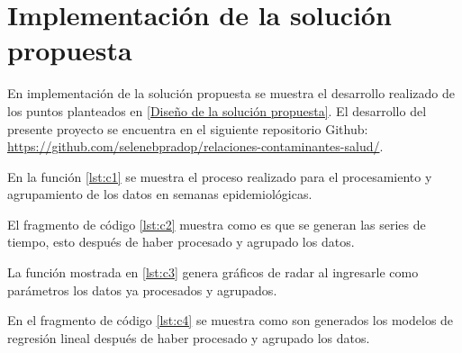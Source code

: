 \section{Implementación de la solución propuesta}
En implementación de la solución propuesta se muestra el desarrollo realizado de los puntos planteados en \ref{Diseño de la solución propuesta}. El desarrollo del presente proyecto se encuentra en el siguiente repositorio Github: \url{https://github.com/selenebpradop/relaciones-contaminantes-salud/}.

\begin{description}
\item{En la función \ref{lst:c1} se muestra el proceso realizado para el procesamiento y agrupamiento de los datos en semanas epidemiológicas.}
\item{El fragmento de código \ref{lst:c2} muestra como es que se generan las series de tiempo, esto después de haber procesado y agrupado los datos.}
\item{La función mostrada en \ref{lst:c3} genera gráficos de radar al ingresarle como parámetros los datos ya procesados y agrupados.}
\item{En el fragmento de código \ref{lst:c4} se muestra como son generados los modelos de regresión lineal después de haber procesado y agrupado los datos.}
\end{description}

\clearpage

